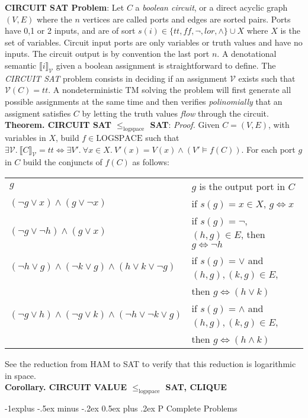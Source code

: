 \documentclass[10pt,landscape]{article}
\makeatletter
\newcommand{\V}{\mathcal{V}}
\newcommand{\LOGSPACE}{\mathrm{LOGSPACE}}
\newcommand{\red}[1]{\leqslant_{#1}}
\renewcommand{\iff}{\Leftrightarrow}
\theoremstyle{plain}%
\theoremstyle{definition}
\theoremstyle{remark}
\renewcommand{\subsection}{\@startsection{subsection}{2}{0mm}%
                                {-1explus -.5ex minus -.2ex}%
                                {0.5ex plus .2ex}%
                                {\normalfont\normalsize\bfseries}}
\makeatother
\begin{document}
\begin{multicols}{4}
\textbf{CIRCUIT SAT Problem}:
Let $C$ a \textit{boolean circuit}, or a direct acyclic graph $(V,E)$ where the $n$ vertices are
called ports and edges are sorted pairs. Ports have 0,1 or 2 inputs, and are of sort
$s(i) \in \{tt,ff,\neg,lor,\land\} \cup X$ where $X$ is the set of variables. Circuit
input ports are only variables or truth values and have no inputs. The circuit output
is by convention the last port $n$. A denotational semantic $\llbracket i \rrbracket_{\V}$
given a boolean assignment is straightforward to define.
The \textit{CIRCUIT SAT} problem consists in deciding if an assignment $\V$ exists such that
$\V(C) = tt$. A nondeterministic TM solving the problem will first generate all possible assignments
at the same time and then verifies \textit{polinomially} that an assigment satisfies $C$ by 
letting the truth values \textit{flow} through the circuit. \\[.2cm]


\textbf{Theorem. CIRCUIT SAT $\red{\text{logspace}}$ SAT}: \textit{Proof. }
Given $C = (V, E)$, with variables in $X$, build $f \in \LOGSPACE$ such that 
$\exists \V .\ \llbracket C \rrbracket_{\V} = tt \iff \exists V' .\ \forall x \in X .\ V'(x) = V(x) \land (V' \vDash f(C))$.
For each port $g$ in $C$ build the conjuncts of $f(C)$ as follows: 
\begin{tabular}{@{}ll@{}}
    $g$ & $g$ is the output port in $C$ \\
    $(\neg g \lor x) \land (g \lor \neg x)$ & if $s(g) = x \in X$, $g \iff x$ \\ 
    $(\neg g \lor \neg h) \land (g \lor x)$ &  if $s(g) = \neg$, $(h,g) \in E$, then $g \iff \neg h$ \\ 
    $(\neg h \lor  g) \land (\neg k \lor g) \land (h \lor k \lor \neg g)$ &  if $s(g) = \lor$ and $(h,g), (k,g) \in E$, \\
    & then $g \iff (h \lor k)$ \\ 
    $(\neg g \lor  h) \land (\neg g \lor k) \land (\neg h \lor \neg k \lor g)$ &  if $s(g) = \land$ and $(h,g), (k,g) \in E$, \\
    & then $g \iff (h \land k)$ 
\end{tabular}
See the reduction from HAM to SAT to verify that this reduction is logarithmic in space. \\[.2cm]

\textbf{Corollary. CIRCUIT VALUE $\red{\text{logspace}}$ SAT, CLIQUE}


\subsection{P Complete Problems}


\end{multicols}
\end{document}
